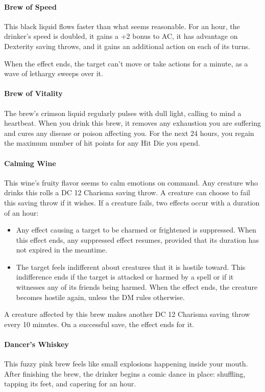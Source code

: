 \paragraph{Brew of Speed} %
    This black liquid flows faster than what seems reasonable.
    For an hour, the drinker's speed is doubled, it gains a +2 bonus to AC, it has advantage on Dexterity saving throws, and it gains an additional action on each of its turns.

    When the effect ends, the target can't move or take actions for a minute, as a wave of lethargy sweeps over it.
\paragraph{Brew of Vitality} %
    The brew's crimson liquid regularly pulses with dull light, calling to mind a heartbeat.
    When you drink this brew, it removes any exhaustion you are suffering and cures any disease or poison affecting you.
    For the next 24 hours, you regain the maximum number of hit points for any Hit Die you spend.
\paragraph{Calming Wine} %
    This wine's fruity flavor seems to calm emotions on command.
    Any creature who drinks this rolls a DC 12 Charisma saving throw.
    A creature can choose to fail this saving throw if it wishes.
    If a creature fails, two effects occur with a duration of an hour:
    \begin{itemize}
        \item Any effect causing a target to be charmed or frightened is suppressed.
        When this effect ends, any suppressed effect resumes, provided that its duration has not expired in the meantime.
        \item The target feels indifferent about creatures that it is hostile toward.
        This indifference ends if the target is attacked or harmed by a spell or if it witnesses any of its friends being harmed.
        When the effect ends, the creature becomes hostile again, unless the DM rules otherwise.
    \end{itemize}

    A creature affected by this brew makes another DC 12 Charisma saving throw every 10 minutes.
    On a successful save, the effect ends for it.
\paragraph{Dancer's Whiskey} %
    This fuzzy pink brew feels like small explosions happening inside your mouth.
    After finishing the brew, the drinker begins a comic dance in place: shuffling, tapping its feet, and capering for an hour.

